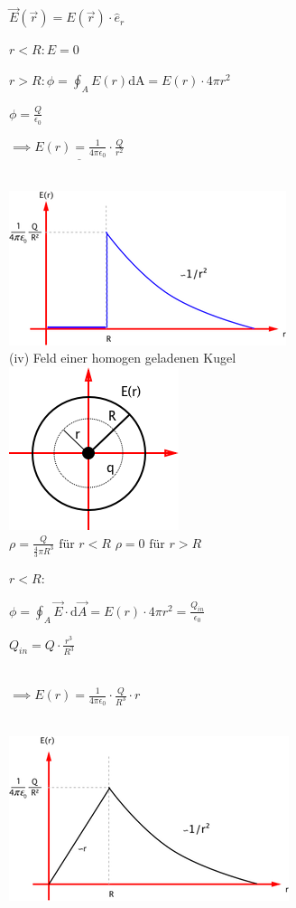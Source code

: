 \documentclass[11pt]{article}
\begin{document}
$ \vec{E}(\vec{r})= E(\vec{r})\cdot\hat{e}_r $

$ r<R: E=0 $

$ r>R: \phi=\oint_{A}E(r)\mathrm{dA}=E(r)\cdot4\pi r^2 $

$ \phi=\frac{Q}{\epsilon_0} $

$ \implies \underline{E(r)= \frac{1}{4\pi\epsilon_0}\cdot\frac{Q}{r^2}} $

\hfill\\

\includegraphics{skizzen/14/14_6B5}\\

(iv) Feld einer homogen geladenen Kugel\\

\includegraphics{skizzen/14/14_6B6}\\

$ \rho =\frac{Q}{\frac{4}{3}\pi R^3} \text{ für }r<R $
$ \rho=0 \text{ für }r>R$

\underline{$r<R$}:

$ \phi=\oint_{A}\vec{E}\cdot\mathrm{d}\vec{A} = E(r)\cdot4\pi r^2=\frac{Q_{in}}{\epsilon_0}$

$ Q_{in} = Q\cdot\frac{r^3}{R^3} $

\hfill\\

$\boxed{ \implies E(r)=\frac{1}{4\pi\epsilon_0}\cdot\frac{Q}{R^3}\cdot r }$

\hfill\\

\includegraphics{skizzen/14/14_6B7}\\
\end{document}
